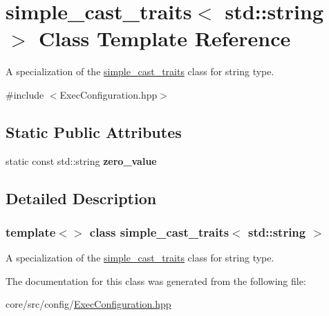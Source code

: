 \hypertarget{classsimple__cast__traits_3_01std_1_1string_01_4}{
\section{simple\_\-cast\_\-traits$<$ std::string $>$ Class Template Reference}
\label{classsimple__cast__traits_3_01std_1_1string_01_4}
}


A specialization of the \hyperlink{classsimple__cast__traits}{simple\_\-cast\_\-traits} class for string type.  




{\ttfamily \#include $<$ExecConfiguration.hpp$>$}

\subsection*{Static Public Attributes}
\begin{DoxyCompactItemize}
\item 
\hypertarget{classsimple__cast__traits_3_01std_1_1string_01_4_af22233acb9498c4504a1374e8af33fb3}{
static const std::string {\bfseries zero\_\-value}}
\label{classsimple__cast__traits_3_01std_1_1string_01_4_af22233acb9498c4504a1374e8af33fb3}

\end{DoxyCompactItemize}


\subsection{Detailed Description}
\subsubsection*{template$<$$>$ class simple\_\-cast\_\-traits$<$ std::string $>$}

A specialization of the \hyperlink{classsimple__cast__traits}{simple\_\-cast\_\-traits} class for string type. 

The documentation for this class was generated from the following file:\begin{DoxyCompactItemize}
\item 
core/src/config/\hyperlink{ExecConfiguration_8hpp}{ExecConfiguration.hpp}\end{DoxyCompactItemize}
